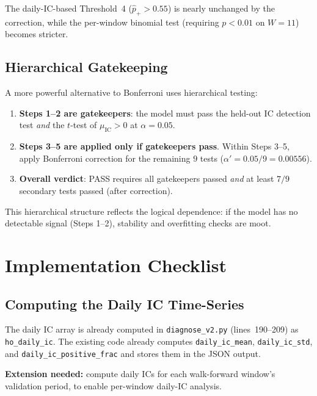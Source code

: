 \documentclass[11pt,a4paper]{article}
\theoremstyle{definition}
\newcommand{\IC}{\operatorname{IC}}
\begin{document}
The daily-IC-based Threshold~4 ($\hat{p}_{+} > 0.55$) is nearly unchanged
by the correction, while the per-window binomial test (requiring $p<0.01$
on $W=11$) becomes stricter.

\subsection{Hierarchical Gatekeeping}

A more powerful alternative to Bonferroni uses hierarchical testing:
\begin{enumerate}[nosep]
    \item \textbf{Steps 1--2 are gatekeepers}: the model must pass the
          held-out IC detection test \emph{and} the $t$-test of
          $\mu_{\IC} > 0$ at $\alpha=0.05$.
    \item \textbf{Steps 3--5 are applied only if gatekeepers pass}.
          Within Steps 3--5, apply Bonferroni correction for the
          remaining $9$ tests ($\alpha' = 0.05/9 = 0.00556$).
    \item \textbf{Overall verdict}: PASS requires all gatekeepers
          passed \emph{and} at least $7/9$ secondary tests passed
          (after correction).
\end{enumerate}

This hierarchical structure reflects the logical dependence: if the
model has no detectable signal (Steps 1--2), stability and overfitting
checks are moot.

\section{Implementation Checklist}
\label{sec:implementation}

\subsection{Computing the Daily IC Time-Series}

The daily IC array is already computed in \texttt{diagnose\_v2.py}
(lines~190--209) as \texttt{ho\_daily\_ic}. The existing code already
computes \texttt{daily\_ic\_mean}, \texttt{daily\_ic\_std}, and
\texttt{daily\_ic\_positive\_frac} and stores them in the JSON output.

\textbf{Extension needed:} compute daily ICs for each walk-forward
window's validation period, to enable per-window daily-IC analysis.
\end{document}
